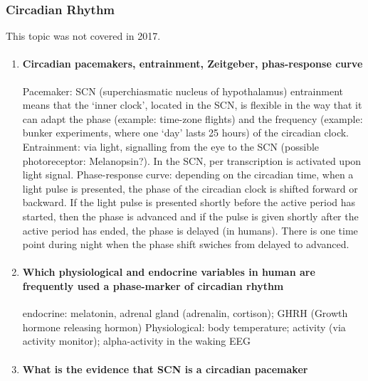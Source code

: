 \documentclass[12pt,article,oneside,a4paper]{memoir}
\begin{document}
\subsubsection{Circadian Rhythm}
This topic was not covered in 2017.
\begin{enumerate}
\item \paragraph{Circadian pacemakers, entrainment, Zeitgeber, phas-response
curve}

Pacemaker: SCN (superchiasmatic nucleus of hypothalamus)
entrainment means that the ‘inner clock’, located in the SCN, is flexible in
the way that it can adapt the phase (example: time-zone flights) and the
frequency (example: bunker experiments, where one ‘day’ lasts 25 hours) of the
circadian clock.
Entrainment: via light, signalling from the eye to the SCN (possible
photoreceptor: Melanopsin?). In the SCN, per transcription is activated upon
light signal.
Phase-response curve: depending on the circadian time, when a light pulse is
presented, the phase of the circadian clock is shifted forward or backward. If
the light pulse is presented shortly before the active period has started, then
the phase is advanced and if the pulse is given shortly after the active period
has ended, the phase is delayed (in humans). There is one time point during
night when the phase shift swiches from delayed to advanced.

\item \paragraph{Which physiological and endocrine variables in human are
frequently used a phase-marker of circadian rhythm}

endocrine: melatonin, adrenal gland (adrenalin, cortison); GHRH (Growth
hormone releasing hormon)
Physiological: body temperature; activity (via activity monitor);
alpha-activity in the waking EEG

\item \paragraph{What is the evidence that SCN is a circadian pacemaker}


\end{enumerate}
\end{document}
